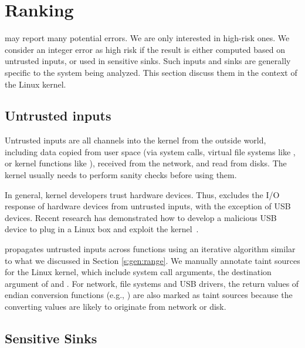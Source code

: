 \section{Ranking}
\label{s:rank}

\sys may report many potential errors.  We are only interested
in high-risk ones.  We consider an integer error as high risk if the
result is either computed based on untrusted inputs, or used in
sensitive sinks.  Such inputs and sinks are generally specific to
the system being analyzed.  This section discuss them in the context
of the Linux kernel.

\subsection{Untrusted inputs}
\label{s:rank:input}

Untrusted inputs are all channels into the kernel from the outside world,
including data copied from user space (via system calls, virtual file
systems like , or kernel functions like ),
received from the network, and read from disks. The kernel usually needs to
perform sanity checks before using them. 

In general, kernel developers trust hardware devices. Thus, \sys
excludes the I/O response of hardware devices from untrusted inputs,
with the exception of USB devices.  Recent research has demonstrated
how to develop a malicious USB device to plug in a Linux box and
exploit the kernel~\cite{usb:buffer-overflow}.

\sys propagates untrusted inputs across functions using an iterative algorithm
similar to what we discussed in Section \ref{s:gen:range}. We manually annotate
taint sources for the Linux kernel, which include system call arguments, the
destination argument of  and . For network,
file systems and USB drivers, the return values of endian conversion functions
(e.g., ) are also marked as taint sources because the
converting values are likely to originate from network or disk.




\subsection{Sensitive Sinks}

